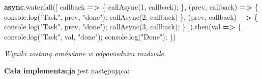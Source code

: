 \documentclass[11pt]{article}
\newenvironment{Shaded}{}{}
\newcommand{\KeywordTok}[1]{\textcolor[rgb]{0.00,0.44,0.13}{\textbf{{#1}}}}
\newcommand{\DecValTok}[1]{\textcolor[rgb]{0.25,0.63,0.44}{{#1}}}
\newcommand{\StringTok}[1]{\textcolor[rgb]{0.25,0.44,0.63}{{#1}}}
\newcommand{\FunctionTok}[1]{\textcolor[rgb]{0.02,0.16,0.49}{{#1}}}
\newcommand{\NormalTok}[1]{{#1}}
\newcommand{\OperatorTok}[1]{\textcolor[rgb]{0.40,0.40,0.40}{{#1}}}
\newcommand{\BuiltInTok}[1]{{#1}}
\begin{document}
\begin{Shaded}
\begin{Highlighting}[]
\KeywordTok{async}\OperatorTok{.}\FunctionTok{waterfall}\NormalTok{([}
\NormalTok{    callback }\KeywordTok{=\textgreater{}}\NormalTok{ \{}
        \FunctionTok{callAsync}\NormalTok{(}\DecValTok{1}\OperatorTok{,}\NormalTok{ callback)}\OperatorTok{;}
\NormalTok{    \}}\OperatorTok{,}
\NormalTok{    (prev}\OperatorTok{,}\NormalTok{ callback) }\KeywordTok{=\textgreater{}}\NormalTok{ \{}
        \BuiltInTok{console}\OperatorTok{.}\FunctionTok{log}\NormalTok{(}\StringTok{"Task"}\OperatorTok{,}\NormalTok{ prev}\OperatorTok{,} \StringTok{"done"}\NormalTok{)}\OperatorTok{;}
        \FunctionTok{callAsync}\NormalTok{(}\DecValTok{2}\OperatorTok{,}\NormalTok{ callback)}
\NormalTok{    \}}\OperatorTok{,}
\NormalTok{    (prev}\OperatorTok{,}\NormalTok{ callback) }\KeywordTok{=\textgreater{}}\NormalTok{ \{}
        \BuiltInTok{console}\OperatorTok{.}\FunctionTok{log}\NormalTok{(}\StringTok{"Task"}\OperatorTok{,}\NormalTok{ prev}\OperatorTok{,} \StringTok{"done"}\NormalTok{)}\OperatorTok{;}
        \FunctionTok{callAsync}\NormalTok{(}\DecValTok{3}\OperatorTok{,}\NormalTok{ callback)}\OperatorTok{;}
\NormalTok{    \}}
\NormalTok{])}\OperatorTok{.}\FunctionTok{then}\NormalTok{(val }\KeywordTok{=\textgreater{}}\NormalTok{ \{}
    \BuiltInTok{console}\OperatorTok{.}\FunctionTok{log}\NormalTok{(}\StringTok{"Task"}\OperatorTok{,}\NormalTok{ val}\OperatorTok{,} \StringTok{"done"}\NormalTok{)}\OperatorTok{;}
    \BuiltInTok{console}\OperatorTok{.}\FunctionTok{log}\NormalTok{(}\StringTok{"Done"}\NormalTok{)}\OperatorTok{;}
\NormalTok{\})}
\end{Highlighting}
\end{Shaded}

\emph{Wyniki zostaną omówione w odpowiednim rozdziale.}

    \textbf{Cała implementacja} jest następująca:
\end{document}
